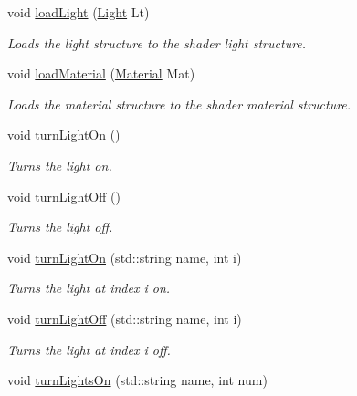 \begin{DoxyCompactItemize}
void \hyperlink{class_graphics_engine_a687536e27a54ba4abc38db5630b5b2cb}{load\+Light} (\hyperlink{class_light}{Light} Lt)
\begin{DoxyCompactList}\small\item\em Loads the light structure to the shader light structure. \end{DoxyCompactList}\item 
void \hyperlink{class_graphics_engine_a0c2bb113161925bee3fd440b8425f3c3}{load\+Material} (\hyperlink{class_material}{Material} Mat)
\begin{DoxyCompactList}\small\item\em Loads the material structure to the shader material structure. \end{DoxyCompactList}\item 
\mbox{\label{class_graphics_engine_a8f7e4cd6c3ff99709e82afca13732737}} 
void \hyperlink{class_graphics_engine_a8f7e4cd6c3ff99709e82afca13732737}{turn\+Light\+On} ()
\begin{DoxyCompactList}\small\item\em Turns the light on. \end{DoxyCompactList}\item 
\mbox{\label{class_graphics_engine_a050412ce3708afcbedb4eb3af999dacc}} 
void \hyperlink{class_graphics_engine_a050412ce3708afcbedb4eb3af999dacc}{turn\+Light\+Off} ()
\begin{DoxyCompactList}\small\item\em Turns the light off. \end{DoxyCompactList}\item 
void \hyperlink{class_graphics_engine_a72154214616a1799e1670451586c3983}{turn\+Light\+On} (std\+::string name, int i)
\begin{DoxyCompactList}\small\item\em Turns the light at index i on. \end{DoxyCompactList}\item 
void \hyperlink{class_graphics_engine_adb11cc7d06a8fa721d2037791297f102}{turn\+Light\+Off} (std\+::string name, int i)
\begin{DoxyCompactList}\small\item\em Turns the light at index i off. \end{DoxyCompactList}\item 
void \hyperlink{class_graphics_engine_aa518c204407c9d1b380d200ef79952f1}{turn\+Lights\+On} (std\+::string name, int num)

\end{DoxyCompactItemize}
